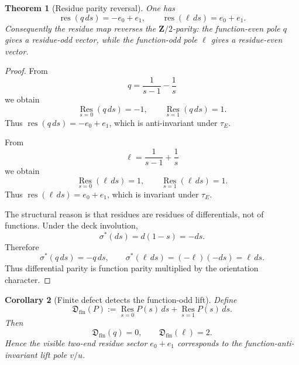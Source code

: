 \documentclass[11pt]{article}
\newcommand{\Z}{\mathbf Z}
\newcommand{\Res}{\operatorname*{Res}}
\newcommand{\res}{\operatorname{res}}
\newcommand{\ellp}{\ell}
\newcommand{\1}{\mathbf 1}
\newcommand{\fin}{\mathrm{fin}}
\newtheorem{theorem}{Theorem}[section]
\newtheorem{corollary}[theorem]{Corollary}
\numberwithin{equation}{section}
\begin{document}
\begin{theorem}[Residue parity reversal]\label{thm:residue-reversal}
One has
\begin{equation}
  \res(q\,ds)=-e_0+e_1,
  \qquad
  \res(\ellp\,ds)=e_0+e_1.
\end{equation}
Consequently the residue map reverses the $\Z/2$-parity: the function-even pole $q$ gives a residue-odd vector, while the function-odd pole $\ellp$ gives a residue-even vector.
\end{theorem}

\begin{proof}
From
\begin{equation}
  q=\frac1{s-1}-\frac1s
\end{equation}
we obtain
\begin{equation}
  \Res_{s=0}(q\,ds)=-1,
  \qquad
  \Res_{s=1}(q\,ds)=1.
\end{equation}
Thus $\res(q\,ds)=-e_0+e_1$, which is anti-invariant under $\tau_E$.

From
\begin{equation}
  \ellp=\frac1{s-1}+\frac1s
\end{equation}
we obtain
\begin{equation}
  \Res_{s=0}(\ellp\,ds)=1,
  \qquad
  \Res_{s=1}(\ellp\,ds)=1.
\end{equation}
Thus $\res(\ellp\,ds)=e_0+e_1$, which is invariant under $\tau_E$.

The structural reason is that residues are residues of differentials, not of functions.  Under the deck involution,
\begin{equation}
  \sigma^*(ds)=d(1-s)=-ds.
\end{equation}
Therefore
\begin{equation}
  \sigma^*(q\,ds)=-q\,ds,
  \qquad
  \sigma^*(\ellp\,ds)=(-\ellp)(-ds)=\ellp\,ds.
\end{equation}
Thus differential parity is function parity multiplied by the orientation character.
\end{proof}

\begin{corollary}[Finite defect detects the function-odd lift]\label{cor:finite-defect-lift}
Define
\begin{equation}
  \mathfrak D_{\fin}(P):=\Res_{s=0}P(s)\,ds+\Res_{s=1}P(s)\,ds.
\end{equation}
Then
\begin{equation}
  \mathfrak D_{\fin}(q)=0,
  \qquad
  \mathfrak D_{\fin}(\ellp)=2.
\end{equation}
Hence the visible two-end residue sector $e_0+e_1$ corresponds to the function-anti-invariant lift pole $v/u$.
\end{corollary}
\end{document}
